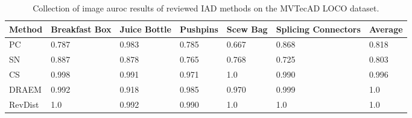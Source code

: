 \begin{table}[htbp]
    \tiny
    \centering
    \begin{tabularx}{\textwidth}{|X|X|X|X|X|X|X|}%
        \hline
        \textbf{Method} & \textbf{Breakfast Box} & \textbf{Juice Bottle} & \textbf{Pushpins} & \textbf{Scew Bag} & \textbf{Splicing Connectors} & \textbf{Average} \\
        \hline
        PC \cite{patchCore2022} & 0.787 & 0.983 & 0.785 & 0.667 & 0.868 & 0.818 \\
        \hline
        SN \cite{liu2023simplenet} & 0.887 & 0.878 & 0.765 & 0.768 & 0.725 & 0.803 \\
        \hline  %
        CS \cite{csflow2022} & 0.998 & 0.991 & 0.971 & 1.0 & 0.990 & 0.996 \\
        \hline
        DRAEM \cite{Zavrtanik_2021DRAEM} & 0.992 & 0.918 & 0.985 & 0.970 & 0.999 & 1.0 \\
        \hline
        RevDist \cite{revdist2023} & 1.0 & 0.992 & 0.990 & 1.0 & 1.0 & 1.0 \\
        \hline
    \end{tabularx}
    \caption{Collection of image auroc results of reviewed IAD methods on the MVTecAD LOCO \cite{LOCODentsAndScratchesBergmann2022} dataset.}
    \label{tab:imageaurocloco}
\end{table}





